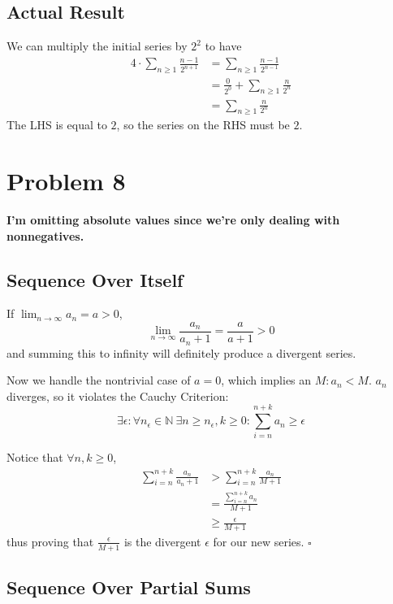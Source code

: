 \documentclass[12pt]{article}
\newcommand{\N}{\mathbb{N}}
\begin{document}
\subsection{Actual Result}

We can multiply the initial series by $2^2$ to have
\begin{align*}
  4 \cdot \sum_{n \ge 1} \frac{n-1}{2^{n+1}}
   & = \sum_{n \ge 1} \frac{n-1}{2^{n-1}}           \\
   & = \frac{0}{2^0} + \sum_{n \ge 1} \frac{n}{2^n} \\
   & = \sum_{n \ge 1} \frac{n}{2^n}
\end{align*}
The LHS is equal to $2$, so the series on the RHS must be $\boxed{2}$.

\section{Problem 8}

\textbf{I'm omitting absolute values since we're only dealing with nonnegatives.}

\subsection{Sequence Over Itself}

If $\lim_{n \to \infty} a_n = a > 0$,
\[\lim_{n \to \infty} \frac{a_n}{a_n+1}=\frac{a}{a+1} > 0\]
and summing this to infinity will definitely produce a divergent series.

Now we handle the nontrivial case of $a=0$, which implies an $M: a_n < M$.
$a_n$ diverges, so it violates the Cauchy Criterion:
\[\exists \epsilon: \forall n_\epsilon \in \N\ \exists n \ge n_\epsilon, k \ge 0: \sum_{i=n}^{n+k} a_n \ge \epsilon\]

Notice that $\forall n, k \ge 0$,
\begin{align*}
  \sum_{i=n}^{n+k} \frac{a_n}{a_n+1}
   & > \sum_{i=n}^{n+k} \frac{a_n}{M+1} \\
   & = \frac{\sum_{i=n}^{n+k} a_n}{M+1} \\
   & \ge \frac{\epsilon}{M+1}
\end{align*}
thus proving that $\frac{\epsilon}{M+1}$ is the divergent $\epsilon$ for our new series. $\square$

\subsection{Sequence Over Partial Sums}
\end{document}
